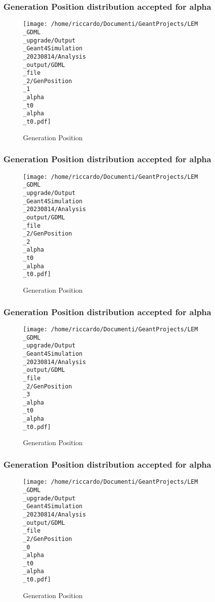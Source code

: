\documentclass[8pt]{beamer}
\begin{document}
            \begin{frame}
                \frametitle{Generation Position distribution accepted for alpha}
            
        \begin{figure}[h]
            \centering
            \texttt{[image: /home/riccardo/Documenti/GeantProjects/LEM\\\_GDML\\\_upgrade/Output\\\_Geant4Simulation\\\_20230814/Analysis\\\_output/GDML\\\_file\\\_2/GenPosition\\\_1\\\_alpha\\\_t0\\\_alpha\\\_t0.pdf]}
            \caption{Generation Position}
        \end{figure}
        
            \end{frame}
            
            \begin{frame}
                \frametitle{Generation Position distribution accepted for alpha}
            
        \begin{figure}[h]
            \centering
            \texttt{[image: /home/riccardo/Documenti/GeantProjects/LEM\\\_GDML\\\_upgrade/Output\\\_Geant4Simulation\\\_20230814/Analysis\\\_output/GDML\\\_file\\\_2/GenPosition\\\_2\\\_alpha\\\_t0\\\_alpha\\\_t0.pdf]}
            \caption{Generation Position}
        \end{figure}
        
            \end{frame}
            
            \begin{frame}
                \frametitle{Generation Position distribution accepted for alpha}
            
        \begin{figure}[h]
            \centering
            \texttt{[image: /home/riccardo/Documenti/GeantProjects/LEM\\\_GDML\\\_upgrade/Output\\\_Geant4Simulation\\\_20230814/Analysis\\\_output/GDML\\\_file\\\_2/GenPosition\\\_3\\\_alpha\\\_t0\\\_alpha\\\_t0.pdf]}
            \caption{Generation Position}
        \end{figure}
        
            \end{frame}
            
            \begin{frame}
                \frametitle{Generation Position distribution accepted for alpha}
            
        \begin{figure}[h]
            \centering
            \texttt{[image: /home/riccardo/Documenti/GeantProjects/LEM\\\_GDML\\\_upgrade/Output\\\_Geant4Simulation\\\_20230814/Analysis\\\_output/GDML\\\_file\\\_2/GenPosition\\\_0\\\_alpha\\\_t0\\\_alpha\\\_t0.pdf]}
            \caption{Generation Position}
        \end{figure}
        
            \end{frame}
            
\end{document}
